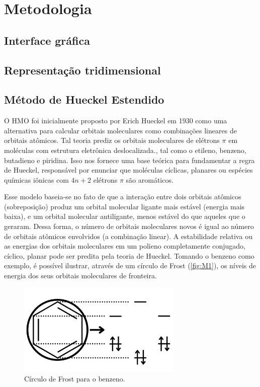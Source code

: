 \chapter{Metodologia
}\label{cap:desenvolvimento}
\section{Interface gráfica}

\section{Representação tridimensional}

\section{Método de Hueckel Estendido}

O \gls{HMO} foi inicialmente proposto por Erich Hueckel em 1930 \autocite{Hckel1931} como uma alternativa para calcular orbitais moleculares como combinações lineares de orbitais atômicos\autocite{Coulson1978-ot}. Tal teoria prediz os orbitais moleculares de elétrons $\pi$ em moléculas com estrutura eletrônica deslocalizada., tal como o etileno, benzeno, butadieno e piridina. Isso nos fornece uma base teórica para fundamentar a regra de Hueckel, responsável por enunciar que moléculas cíclicas, planares ou espécies químicas iônicas com $4n + 2$ elétrons $\pi$ são aromáticos.

Esse modelo baseia-se no fato de que a interação entre dois orbitais atômicos (sobreposição) produz um orbital molecular ligante mais estável (energia mais baixa), e um orbital molecular antiligante, menos estável do que aqueles que o geraram. Dessa forma, o número de orbitais moleculares novos é igual ao número de orbitais atômicos envolvidos (a combinação linear). A estabilidade relativa ou as energias dos orbitais moleculares em um polieno completamente conjugado, cíclico, planar pode ser predita pela teoria de Hueckel. Tomando o benzeno como exemplo, é possível ilustrar, através de um círculo de Frost (\autoref{fig:M1}), os níveis de energia dos seus orbitais moleculares de fronteira.

\begin{figure}[htb]
	\caption{\label{fig:M1} Círculo de Frost para o benzeno.}
	\begin{center}
		\includegraphics[width=0.70\textwidth]{images/figM.png}
	\end{center}
\end{figure}

